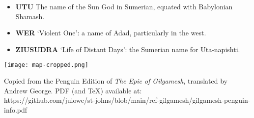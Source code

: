 \documentclass{article}
\begin{document}
\begin{multicols}{3}
\begin{small}
\begin{itemize}[
        label=,
        leftmargin=1.0em,
        itemindent=-1.0em,
        nosep,
    ]
    \item \textbf{UTU}
    The name of the Sun God in Sumerian, equated with Babylonian Shamash.

    \item \textbf{WER} `Violent One': a name of Adad, particularly in the west.

    \item \textbf{ZIUSUDRA}
    `Life of Distant Days': the Sumerian name for Uta-napishti.




\end{itemize}


\end{small}



\noindent 
\centering
\texttt{[image: map-cropped.png]}

\end{multicols}







\vspace{-0.3cm}
\begin{footnotesize}
    Copied from the Penguin Edition of \textit{The Epic of Gilgamesh}, translated by Andrew George. PDF (and \TeX) available at:\\ https://github.com/julowe/st-johns/blob/main/ref-gilgamesh/gilgamesh-penguin-info.pdf
\end{footnotesize}


\end{document}
